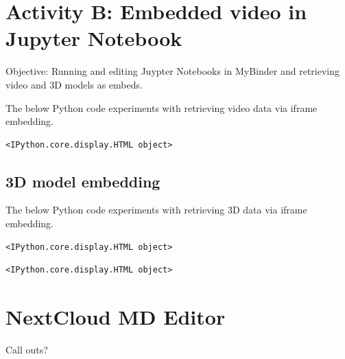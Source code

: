 \documentclass[
  letterpaper,
]{book}
\begin{document}

\hypertarget{activity-b-embedded-video-in-jupyter-notebook}{%
\chapter{Activity B: Embedded video in Jupyter
Notebook}\label{activity-b-embedded-video-in-jupyter-notebook}}

Objective: Running and editing Juypter Notebooks in MyBinder and
retrieving video and 3D models as embeds.

The below Python code experiments with retrieving video data via iframe
embedding.

\begin{verbatim}
<IPython.core.display.HTML object>
\end{verbatim}

\hypertarget{d-model-embedding}{%
\section{3D model embedding}\label{d-model-embedding}}

The below Python code experiments with retrieving 3D data via iframe
embedding.

\begin{verbatim}
<IPython.core.display.HTML object>
\end{verbatim}

\begin{verbatim}
<IPython.core.display.HTML object>
\end{verbatim}


\hypertarget{nextcloud-md-editor}{%
\chapter{NextCloud MD Editor}\label{nextcloud-md-editor}}

Call outs?
\end{document}
